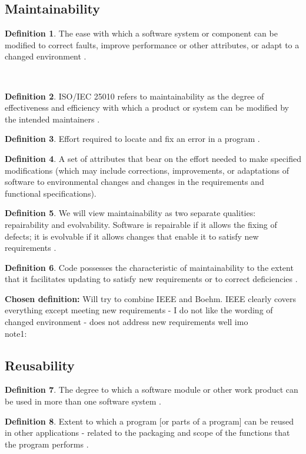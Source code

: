 \documentclass[letterpaper,cleveref]{lipics-v2019}
\theoremstyle{definition}
\newtheorem{defn}{Definition}
\begin{document}
\subsection{Maintainability}
\begin{defn}
The ease with which a software system or component can be modified to correct faults, improve performance or other attributes, or adapt to a changed environment \cite{IEEEStdGlossarySET1990}. 
\end{defn}\
\begin{defn}
ISO/IEC 25010 refers to maintainability as the degree of effectiveness and efficiency with which a product or system can be modified by the intended maintainers \cite{ISO/IEC25010}.
\end{defn}
\begin{defn}
Effort required to locate and fix an error in a program
\cite{pressman2005software}.\\
\end{defn}
\begin{defn}
A set of attributes that bear on the effort needed to make specified modifications (which may include corrections, improvements, or adaptations of software to environmental changes and changes in the requirements and functional specifications)\cite{pfleeger2006software}.
\end{defn}
\begin{defn}
We will view maintainability as two separate qualities: repairability and evolvability. Software is repairable if it allows the fixing of defects; it is evolvable if it allows changes that enable it to satisfy new requirements \cite{ghezzi1991fundamentals}.
\end{defn}
\begin{defn}
Code possesses the characteristic of maintainability to the extent that it facilitates updating to satisfy new requirements or to correct deficiencies \cite{boehm2007software}.
\end{defn}

\textbf{Chosen definition:}
Will try to combine IEEE and Boehm. IEEE clearly covers everything except meeting new requirements - I do not like the wording of changed environment - does not address new requirements well imo \\

note1: \\



\subsection{Reusability}
\begin{defn}
The degree to which a software module or other work product can be used in more than one software system \cite{IEEEStdGlossarySET1990}. \\
\end{defn}
\begin{defn}
Extent to which a program [or parts of a program] can be reused in other applications - related to the packaging and scope of the functions that the program performs \cite{pressman2005software}.\\
\end{defn}
\end{document}
